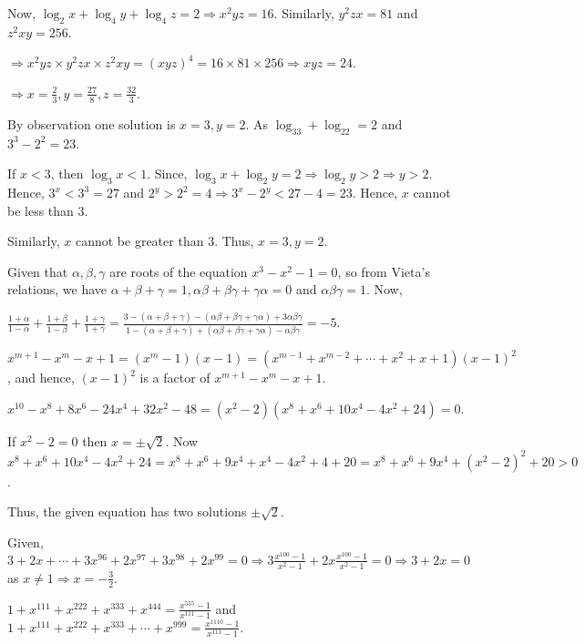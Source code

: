   Now, $\log_2x + \log_4y + \log_4z = 2 \Rightarrow x^2yz = 16$. Similarly, $y^2zx = 81$ and $z^2xy = 256$.

  $\Rightarrow x^2yz\times y^2zx\times z^2xy = (xyz)^4 = 16\times81\times256 \Rightarrow xyz = 24$.

  $\Rightarrow x = \frac{2}{3}, y = \frac{27}{8}, z = \frac{32}{3}$.
\item By observation one solution is $x = 3, y = 2$. As $\log_33 + \log_22 = 2$ and $3^3 - 2^2 = 23$.

  If $x < 3$, then $\log_3x < 1$. Since, $\log_3x + \log_2y = 2\Rightarrow \log_2y > 2\Rightarrow y >
  2$. Hence, $3^x < 3^3 = 27$ and $2^y > 2^2 = 4\Rightarrow 3^x - 2^y < 27 - 4 = 23$. Hence, $x$ cannot be
  less than $3$.

  Similarly, $x$ cannot be greater than $3$. Thus, $x = 3, y = 2$.
\item Given that $\alpha, \beta, \gamma$ are roots of the equation $x^3 - x^2 - 1 = 0$, so from Vieta's
  relations, we have $\alpha + \beta + \gamma = 1, \alpha\beta + \beta\gamma + \gamma\alpha = 0$ and
  $\alpha\beta\gamma = 1$. Now,

  $\frac{1 + \alpha}{1 - \alpha} + \frac{1 + \beta}{1 - \beta} + \frac{1 + \gamma}{1 + \gamma} = \frac{3 -
    (\alpha + \beta + \gamma) - (\alpha\beta + \beta\gamma + \gamma\alpha) + 3\alpha\beta\gamma}{1 - (\alpha
    + \beta + \gamma) + (\alpha\beta + \beta\gamma + \gamma\alpha) - \alpha\beta\gamma} = -5$.
\item $x^{m + 1} - x^m - x + 1 = (x^m - 1)(x - 1) = (x^{m - 1} + x^{m - 2} + \cdots + x^2 + x + 1)(x - 1)^2$,
  and hence, $(x - 1)^2$ is a factor of $x^{m + 1} - x^m - x + 1$.
\item $x^{10} - x^{8} + 8x^6 - 24x^4 + 32x^2 - 48 = (x^2 - 2)(x^8 + x^6 + 10x^4 - 4x^2 + 24) = 0$.

  If $x^2 - 2 = 0$ then $x = \pm\sqrt{2}$. Now $x^8 + x^6 + 10x^4 - 4x^2 + 24 = x^8 + x^6 + 9x^4 + x^4 -
  4x^2 + 4 + 20 = x^8 + x^6 + 9x^4 + (x^2 - 2)^2 + 20 > 0$.

  Thus, the given equation has two solutions $\pm\sqrt{2}$.
\item Given, $3 + 2x + \cdots + 3x^{96} + 2x^{97} + 3x^{98} + 2x^{99} = 0 \Rightarrow 3\frac{x^{100} -
  1}{x^2 - 1} + 2x\frac{x^{100} - 1}{x^2 - 1} = 0\Rightarrow 3 + 2x = 0$ as $x\neq 1\Rightarrow x =
  -\frac{3}{2}$.
\item $1 + x^{111} + x^{222} + x^{333} + x^{444} = \frac{x^{555} - 1}{x^{111} - 1}$ and $1 + x^{111} +
  x^{222} + x^{333} + \cdots + x^{999} = \frac{x^{1110} - 1}{x^{111} - 1}$.

